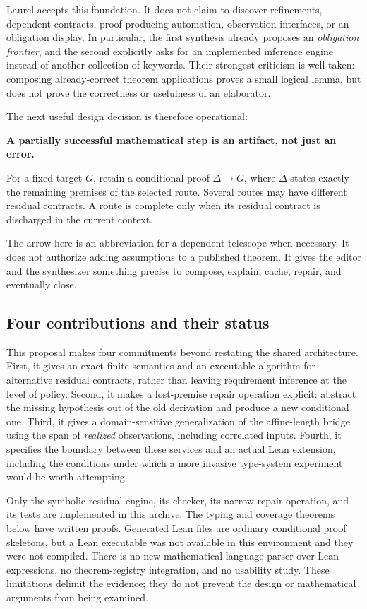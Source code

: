 \documentclass[11pt,a4paper]{article}
\theoremstyle{definition}
\theoremstyle{remark}
\begin{document}
Laurel accepts this foundation. It does not claim to discover refinements, dependent contracts, proof-producing automation, observation interfaces, or an obligation display. In particular, the first synthesis already proposes an \emph{obligation frontier}, and the second explicitly asks for an implemented inference engine instead of another collection of keywords. Their strongest criticism is well taken: composing already-correct theorem applications proves a small logical lemma, but does not prove the correctness or usefulness of an elaborator.

The next useful design decision is therefore operational:
\begin{principle}
\textbf{A partially successful mathematical step is an artifact, not just an error.}\par
For a fixed target $G$, retain a conditional proof $\Delta\to G$, where $\Delta$ states exactly the remaining premises of the selected route. Several routes may have different residual contracts. A route is complete only when its residual contract is discharged in the current context.
\end{principle}
The arrow here is an abbreviation for a dependent telescope when necessary. It does not authorize adding assumptions to a published theorem. It gives the editor and the synthesizer something precise to compose, explain, cache, repair, and eventually close.

\subsection{Four contributions and their status}
This proposal makes four commitments beyond restating the shared architecture. First, it gives an exact finite semantics and an executable algorithm for alternative residual contracts, rather than leaving requirement inference at the level of policy. Second, it makes a lost-premise repair operation explicit: abstract the missing hypothesis out of the old derivation and produce a new conditional one. Third, it gives a domain-sensitive generalization of the affine-length bridge using the span of \emph{realized} observations, including correlated inputs. Fourth, it specifies the boundary between these services and an actual Lean extension, including the conditions under which a more invasive type-system experiment would be worth attempting.

Only the symbolic residual engine, its checker, its narrow repair operation, and its tests are implemented in this archive. The typing and coverage theorems below have written proofs. Generated Lean files are ordinary conditional proof skeletons, but a Lean executable was not available in this environment and they were not compiled. There is no new mathematical-language parser over Lean expressions, no theorem-registry integration, and no usability study. These limitations delimit the evidence; they do not prevent the design or mathematical arguments from being examined.
\end{document}
